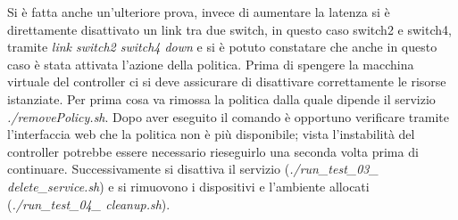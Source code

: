 Si è fatta anche un'ulteriore prova, invece di aumentare la latenza si è direttamente disattivato un link tra due switch, 
in questo caso switch2 e switch4, tramite \textit{link switch2 switch4 down} e si è potuto constatare che anche in questo caso è stata attivata l’azione della politica.
\newline Prima di spengere la macchina virtuale del controller ci si deve assicurare di disattivare correttamente le risorse istanziate.
Per prima cosa va rimossa la politica dalla quale dipende il servizio \textit{./removePolicy.sh}. Dopo aver eseguito il comando 
è opportuno verificare tramite l'interfaccia web che la politica non è più disponibile; vista l'instabilità del controller potrebbe essere necessario rieseguirlo una seconda volta prima di continuare.
Successivamente si disattiva il servizio (\textit{./run\_test\_03\_ delete\_service.sh}) e si rimuovono i dispositivi e l'ambiente allocati (\textit{./run\_test\_04\_ cleanup.sh}).
